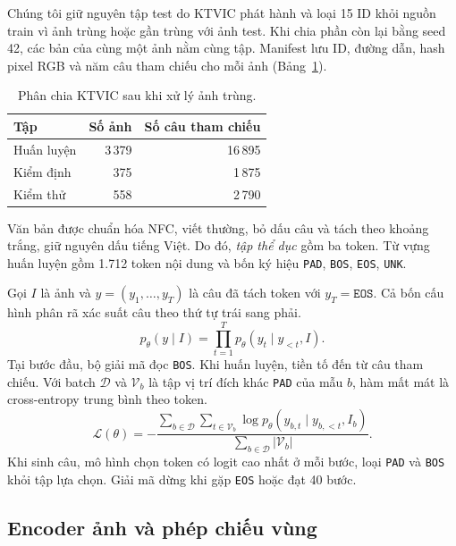 \documentclass[a4paper,11pt]{article}
\begin{document}
Chúng tôi giữ nguyên tập test do KTVIC phát hành và loại 15 ID khỏi nguồn train vì ảnh trùng hoặc gần trùng với ảnh test. Khi chia phần còn lại bằng seed 42, các bản của cùng một ảnh nằm cùng tập. Manifest lưu ID, đường dẫn, hash pixel RGB và năm câu tham chiếu cho mỗi ảnh (Bảng~\ref{tab:data}).

\begin{table}[t]
  \centering
  \begin{tabular}{lrr}
    \toprule
    Tập & Số ảnh & Số câu tham chiếu \\
    \midrule
    Huấn luyện & 3\,379 & 16\,895 \\
    Kiểm định & 375 & 1\,875 \\
    Kiểm thử & 558 & 2\,790 \\
    \bottomrule
  \end{tabular}
  \caption{Phân chia KTVIC sau khi xử lý ảnh trùng.}
  \label{tab:data}
\end{table}

Văn bản được chuẩn hóa NFC, viết thường, bỏ dấu câu và tách theo khoảng trắng, giữ nguyên dấu tiếng Việt. Do đó, \emph{tập thể dục} gồm ba token. Từ vựng huấn luyện gồm 1.712 token nội dung và bốn ký hiệu \texttt{PAD}, \texttt{BOS}, \texttt{EOS}, \texttt{UNK}.

Gọi $I$ là ảnh và $y=(y_1,\ldots,y_T)$ là câu đã tách token với $y_T=\texttt{EOS}$. Cả bốn cấu hình phân rã xác suất câu theo thứ tự trái sang phải.
\begin{equation}
  p_\theta(y\mid I)
    =\prod_{t=1}^{T}p_\theta(y_t\mid y_{<t},I).
  \label{eq:factorization}
\end{equation}
Tại bước đầu, bộ giải mã đọc \texttt{BOS}. Khi huấn luyện, tiền tố đến từ câu tham chiếu. Với batch $\mathcal D$ và $\mathcal V_b$ là tập vị trí đích khác \texttt{PAD} của mẫu $b$, hàm mất mát là cross-entropy trung bình theo token.
\begin{equation}
  \mathcal L(\theta)=
    -\frac{\displaystyle\sum_{b\in\mathcal D}\sum_{t\in\mathcal V_b}
        \log p_\theta(y_{b,t}\mid y_{b,<t},I_b)}
    {\displaystyle\sum_{b\in\mathcal D}|\mathcal V_b|}.
  \label{eq:loss}
\end{equation}
Khi sinh câu, mô hình chọn token có logit cao nhất ở mỗi bước, loại \texttt{PAD} và \texttt{BOS} khỏi tập lựa chọn. Giải mã dừng khi gặp \texttt{EOS} hoặc đạt 40 bước.

\subsection{Encoder ảnh và phép chiếu vùng}
\end{document}
